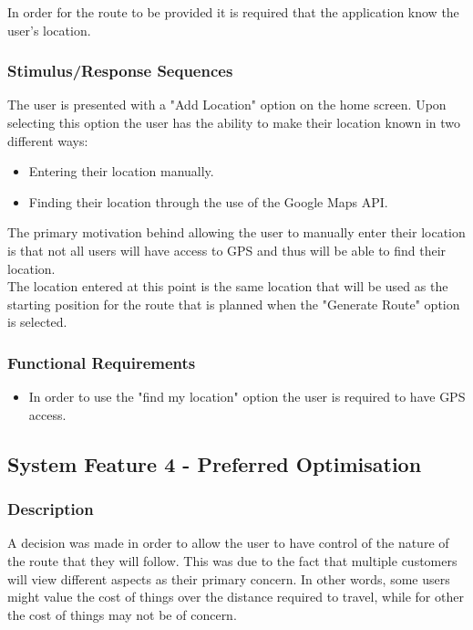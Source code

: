 \documentclass[10pt, a4paper, twocolumn]{scrartcl}
\begin{document}
				In order for the route to be provided it is required that the application know the user's location. 
	
			\subsubsection{Stimulus/Response Sequences}
	
				The user is presented with a "Add Location" option on the home screen. Upon selecting this option the user has the ability to make their location known in two different ways:
	
				\begin{itemize}
					\item Entering their location manually.
					\item Finding their location through the use of the Google Maps API.
				\end{itemize}
	
				The primary motivation behind allowing the user to manually enter their location is that not all users will have access to GPS and thus will be able to find their location.\\
				
				The location entered at this point is the same location that will be used as the starting position for the route that is planned when the "Generate Route" option is selected.
	
			\subsubsection{Functional Requirements}
	
				\begin{itemize}
					\item In order to use the "find my location" option the user is required to have GPS access.
				\end{itemize}
	
		\subsection{System Feature 4 - Preferred Optimisation}
	
			\subsubsection{Description}
			
				A decision was made in order to allow the user to have control of the nature of the route that they will follow. This was due to the fact that multiple customers will view different aspects as their primary concern. In other words, some users might value the cost of things over the distance required to travel, while for other the cost of things may not be of concern.
	
\end{document}
